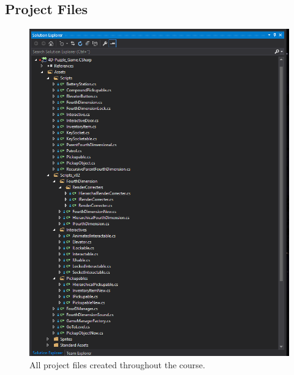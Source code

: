 \pagebreak
\begin{appendices}
	\section{Project Files}
	\label{projectFiles}
	\begin{figure}[h!]
		\centering
		\includegraphics[scale=0.7]{pictures/FileOverview.png}
		\caption{All project files created throughout the course.}
	\end{figure}
	
	\pagebreak

\end{appendices}
